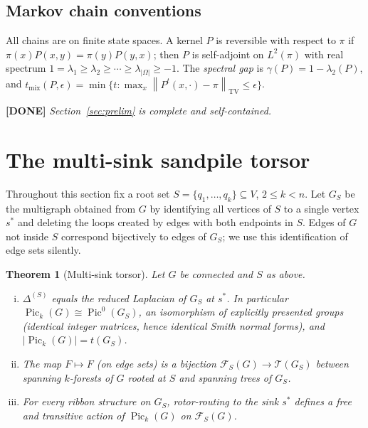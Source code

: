 \documentclass[11pt]{article}
\newcommand{\done}[1]{\medskip\noindent\textcolor{donecol}{\textbf{[DONE]} \emph{#1}}\medskip}
\newcommand{\PicO}[1]{\operatorname{Pic}^0(#1)}
\newcommand{\Pick}[1]{\operatorname{Pic}_k(#1)}
\newcommand{\tv}[1]{\left\lVert #1 \right\rVert_{\mathrm{TV}}}
\newcommand{\Tcal}{\mathcal{T}}
\newcommand{\Fcal}{\mathcal{F}}
\newtheorem{theorem}{Theorem}[section]
\begin{document}
\subsection{Markov chain conventions}

All chains are on finite state spaces. A kernel $P$ is reversible with
respect to $\pi$ if $\pi(x) P(x,y) = \pi(y) P(y,x)$; then $P$ is
self-adjoint on $L^2(\pi)$ with real spectrum
$1 = \lambda_1 \ge \lambda_2 \ge \cdots \ge \lambda_{|\Omega|} \ge -1$. The
\emph{spectral gap} is $\gamma(P) = 1 - \lambda_2(P)$, and
$t_{\mathrm{mix}}(P, \epsilon) = \min\{t : \max_{x}
\tv{P^t(x, \cdot) - \pi} \le \epsilon\}$.

\done{Section~\ref{sec:prelim} is complete and self-contained.}

\section{The multi-sink sandpile torsor}
\label{sec:torsor}

Throughout this section fix a root set $S = \{q_1, \ldots, q_k\} \subseteq
V$, $2 \le k < n$. Let $G_S$ be the multigraph obtained from $G$ by
identifying all vertices of $S$ to a single vertex $s^*$ and deleting the
loops created by edges with both endpoints in $S$. Edges of $G$ not inside
$S$ correspond bijectively to edges of $G_S$; we use this identification of
edge sets silently.

\begin{theorem}[Multi-sink torsor]
\label{thm:torsor}
Let $G$ be connected and $S$ as above.
\begin{enumerate}[(i)]
  \item $\Delta^{(S)}$ equals the reduced Laplacian of $G_S$ at $s^*$. In
    particular $\Pick{G} \cong \PicO{G_S}$, an isomorphism of explicitly
    presented groups (identical integer matrices, hence identical Smith
    normal forms), and $|\Pick{G}| = t(G_S)$.
  \item The map $F \mapsto F$ (on edge sets) is a bijection
    $\Fcal_S(G) \to \Tcal(G_S)$ between spanning $k$-forests of $G$ rooted
    at $S$ and spanning trees of $G_S$.
  \item For every ribbon structure on $G_S$, rotor-routing to the sink
    $s^*$ defines a free and transitive action of $\Pick{G}$ on
    $\Fcal_S(G)$.
\end{enumerate}
\end{theorem}
\end{document}
